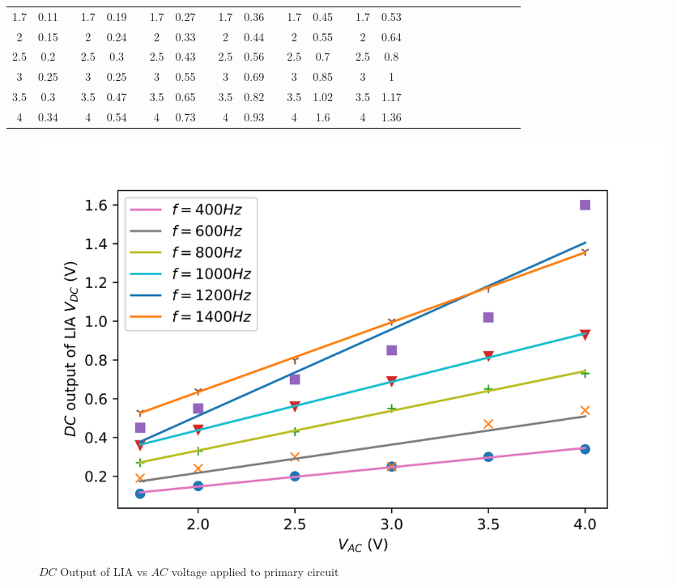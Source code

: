 \documentclass[%
 reprint,
nofootinbib,
 amsmath,amssymb,
 aps,
]{revtex4-2}
\begin{document}
\begin{table}[]
\begin{tabular}{ccccccccccccccccccccccccccc}
            1.7 & 0.11 && 
            1.7 & 0.19 && 
            1.7 & 0.27 &&
            1.7 & 0.36 && 
            1.7 & 0.45 && 
            1.7 & 0.53 \\
            2 & 0.15 && 
            2 & 0.24 && 
            2 & 0.33 && 
            2 & 0.44 && 
            2 & 0.55 && 
            2 & 0.64 \\
            2.5 & 0.2 && 
            2.5 & 0.3 && 
            2.5 & 0.43 && 
            2.5 & 0.56 && 
            2.5 & 0.7 && 
            2.5 & 0.8 \\
            3 & 0.25 && 
            3 & 0.25 && 
            3 & 0.55 && 
            3 & 0.69 && 
            3 & 0.85 && 
            3 & 1 \\
            3.5 & 0.3 && 
            3.5 & 0.47 && 
            3.5 & 0.65 &&
            3.5 & 0.82 && 
            3.5 & 1.02 && 
            3.5 & 1.17 \\
            4 & 0.34 && 
            4 & 0.54 && 
            4 & 0.73 && 
            4 & 0.93 && 
            4 & 1.6 && 
            4 & 1.36 \\ 
            \bottomrule
            \end{tabular}
            \end{table}
            \begin{figure}
                \centering
                \includegraphics[scale = 0.56]{Figures/plot-mutinduct.png}
                \caption{$DC$ Output of LIA vs $AC$ voltage applied to primary circuit}
                \label{fig:mutinductplot}
            \end{figure}
\end{document}
